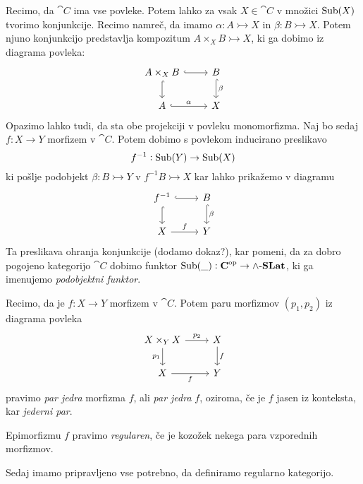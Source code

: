 \documentclass[../kategoricna_logika.tex]{subfiles}
\begin{document}
Recimo, da $\cat{C}$ ima vse povleke. Potem lahko za vsak $X \in \cat{C}$ v množici $\operatorname{Sub}(X)$ tvorimo konjunkcije. Recimo namreč, da imamo $\alpha : A \rightarrowtail X$ in $\beta : B \rightarrowtail X$. Potem njuno konjunkcijo predstavlja kompozitum $A \times_X B \rightarrowtail X$, ki ga dobimo iz diagrama povleka:
\begin{equation*}
    \begin{tikzcd}
        A \times_X B \ar[r, hook] \ar[d, hook] & B \ar[d, hook, "\beta"] \\
        A \ar[r, hook, "\alpha"] & X
    \end{tikzcd}
\end{equation*}
Opazimo lahko tudi, da sta obe projekciji v povleku monomorfizma. Naj bo sedaj $f : X \to Y$ morfizem v $\cat{C}$. Potem dobimo s povlekom inducirano preslikavo
$$f^{-1} : \operatorname{Sub}(Y) \to \operatorname{Sub}(X)$$
ki pošlje podobjekt $\beta : B \rightarrowtail Y$ v $f^{-1}B \rightarrowtail X$ kar lahko prikažemo v diagramu
\begin{equation*}
    \begin{tikzcd}
        f^{-1} \ar[r, hook] \ar[d, hook] & B \ar[d, hook, "\beta"] \\
        X \ar[r, "f"] & Y
    \end{tikzcd}
\end{equation*}
Ta preslikava ohranja konjunkcije (dodamo dokaz?), kar pomeni, da za dobro pogojeno kategorijo $\cat{C}$ dobimo funktor $\operatorname{Sub}(\_) : {\operatorname{\mathbf{C}}}^{\mathrm{op}} \to {\operatorname{\mathbf{\wedge-\mathbf{SLat}}}}$, ki ga imenujemo \emph{podobjektni funktor}.
\begin{definicija}
    Recimo, da je $f : X \to Y$ morfizem v $\cat{C}$. Potem paru morfizmov $(p_1, p_2)$ iz diagrama povleka
    \begin{equation*}
        \begin{tikzcd}
        X \times_Y X \ar[d, "p_1"'] \ar[r, "p_2"] & X \ar[d, "f"] \\
        X \ar[r, "f"'] & Y
        \end{tikzcd}
    \end{equation*}
    pravimo \emph{par jedra} morfizma $f$, ali \emph{par jedra} $f$, oziroma,
    če je $f$ jasen iz konteksta, kar \emph{jederni par}.
\end{definicija}
\begin{definicija}
  Epimorfizmu $f$ pravimo \emph{regularen}, če je kozožek nekega para vzporednih morfizmov.
\end{definicija}
Sedaj imamo pripravljeno vse potrebno, da definiramo regularno kategorijo.
\end{document}
